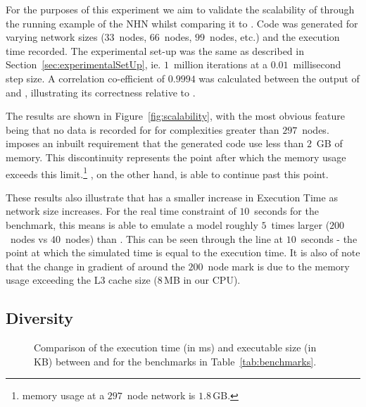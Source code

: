 For the purposes of this experiment we aim to validate the scalability of
\ourTool through the running example of the \ac{NHN} whilst comparing it
to \simulink.  Code was generated for varying network sizes ($33$~nodes,
$66$~nodes, $99$~nodes, etc.) and the execution time recorded.  The
experimental set-up was the same as described in
Section~\ref{sec:experimentalSetUp}, ie. $1$~million iterations at a
$0.01$~millisecond step size.  A correlation co-efficient of $0.9994$ was 
calculated between the output of \ourTool and \simulink, illustrating its 
correctness relative to \simulink.

The results are shown in Figure~\ref{fig:scalability}, with the most
obvious feature being that no data is recorded for \simulink for
complexities greater than $297$~nodes.  \simulink imposes an inbuilt
requirement that the generated code use less than $2$~GB of memory. This
discontinuity represents the point after which the memory usage exceeds
this limit.\footnote{\simulink memory usage at a $297$~node network is 
$1.8$\,GB.}  \ourTool, on the other hand, is able to continue past this
point.

These results also illustrate that \ourTool has a smaller increase in
Execution Time as network size increases. For the real time constraint of 
$10$~seconds for the benchmark, this means \ourTool is able to emulate a model 
roughly $5$~times larger ($200$~nodes vs $40$~nodes) than \simulink.  This 
can be seen through the line at $10$~seconds - the point at which the simulated 
time is equal to the execution time.  It is also of note that the change in 
gradient of \ourTool around the $200$~node mark is due to the memory usage 
exceeding the L$3$ cache size ($8$\,MB in our CPU).


\subsection{Diversity}
\label{sec:diversity}

\begin{figure}[htbp]
  \centering
  \addtolength{\subfigcapskip}{-8pt}
  \caption{Comparison of the execution time (in ms) and executable size
    (in KB) between \simulink and \ourTool for the benchmarks in
    Table~\ref{tab:benchmarks}.}
  \label{fig:results}
\end{figure}


